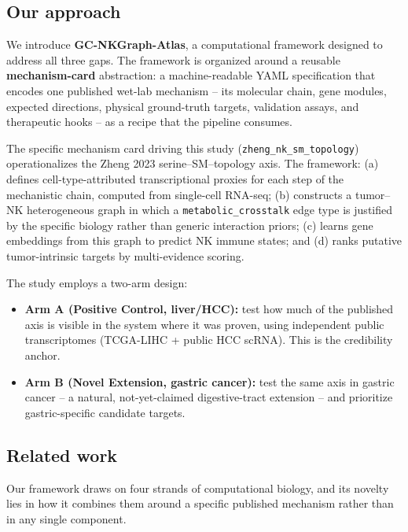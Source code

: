 \documentclass[modern,large,numbered,nocrop]{oup-authoring-template}
\begin{document}
\subsection{Our approach}

We introduce \textbf{GC-NKGraph-Atlas}, a computational framework designed to address all three gaps. The framework is organized around a reusable \textbf{mechanism-card} abstraction: a machine-readable YAML specification that encodes one published wet-lab mechanism -- its molecular chain, gene modules, expected directions, physical ground-truth targets, validation assays, and therapeutic hooks -- as a recipe that the pipeline consumes.

The specific mechanism card driving this study (\texttt{zheng\_nk\_sm\_topology}) operationalizes the Zheng 2023 serine--SM--topology axis. The framework: (a) defines cell-type-attributed transcriptional proxies for each step of the mechanistic chain, computed from single-cell RNA-seq; (b) constructs a tumor--NK heterogeneous graph in which a \texttt{metabolic\_crosstalk} edge type is justified by the specific biology rather than generic interaction priors; (c) learns gene embeddings from this graph to predict NK immune states; and (d) ranks putative tumor-intrinsic targets by multi-evidence scoring.

The study employs a two-arm design:

\begin{itemize}
\item \textbf{Arm A (Positive Control, liver/HCC):} test how much of the published axis is visible in the system where it was proven, using independent public transcriptomes (TCGA-LIHC + public HCC scRNA). This is the credibility anchor.
\item \textbf{Arm B (Novel Extension, gastric cancer):} test the same axis in gastric cancer -- a natural, not-yet-claimed digestive-tract extension -- and prioritize gastric-specific candidate targets.
\end{itemize}

\subsection{Related work}

Our framework draws on four strands of computational biology, and its novelty lies in how it combines them around a specific published mechanism rather than in any single component.
\end{document}
